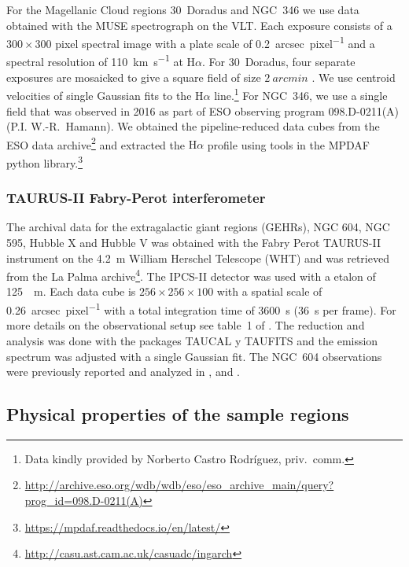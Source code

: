 \documentclass[fleqn,usenatbib, useAMS, a4paper]{mnras}
\newcommand\ha{\ensuremath{\text{H}\alpha}}
\begin{document}
For the Magellanic Cloud regions 30~Doradus and NGC~346 we use data obtained
with the MUSE spectrograph \citep{Bacon:2010a, Bacon:2014a} on the VLT.\@
Each exposure consists of a \(300 \times 300\) pixel spectral image with a plate scale
of \SI{0.2}{arcsec.pixel^{-1}} and a spectral resolution of \SI{110}{km.s^{-1}}
at \ha{}.
For 30~Doradus, four separate exposures are mosaicked to give a square field of
size \(\SI{2}{arcmin}\) \citep{Castro:2018a}. 
We use centroid velocities of single Gaussian fits to the \ha{} line.\footnote{%
  Data kindly provided by Norberto Castro Rodríguez, priv.~comm.
}
For NGC~346, we use a single field that was observed in 2016 as part of
ESO observing program 098.D-0211(A) (P.I. W.-R.~Hamann).
We obtained the pipeline-reduced data cubes from the ESO data archive\footnote{%
  \url{http://archive.eso.org/wdb/wdb/eso/eso_archive_main/query?prog_id=098.D-0211(A)}
}
and extracted the \ha{} profile using tools in the MPDAF python library.\footnote{
  \url{https://mpdaf.readthedocs.io/en/latest/}
} 

\subsubsection{TAURUS-II Fabry-Perot interferometer}
\label{sec:taurus-ii-fabry}

The archival data for the extragalactic giant regions (GEHRs), NGC 604, NGC 595, Hubble X and Hubble V was obtained with the Fabry Perot TAURUS-II instrument
\citep{Gordon:2000v}
on the \SI{4.2}{m} William Herschel Telescope (WHT) and was retrieved from the La Palma archive\footnote{\url{http://casu.ast.cam.ac.uk/casuadc/ingarch}}.
The IPCS-II detector was used with a etalon of \SI{125}{\mu m}.
Each data cube is \(256 \times 256 \times 100\) with a spatial scale of \SI{0.26}{arcsec.pixel^{-1}} with a total integration time of \SI{3600}{s} (\SI{36}{s} per frame).
For more details on the observational setup see table~1 of \citet{sabalisck1995supersonic}.
The reduction and analysis was done with the packages TAUCAL y TAUFITS \citep{1992ASPC...25..445L} and the emission spectrum was adjusted with a single Gaussian fit.
The NGC~604 observations were previously reported and analyzed in
\citet{sabalisck1995supersonic}, \citet{Medina-Tanco:1997a} and \citet{Melnick:2021x}.


\subsection{Physical properties of the sample regions}
\label{sec:regions-milky-way}
\end{document}
